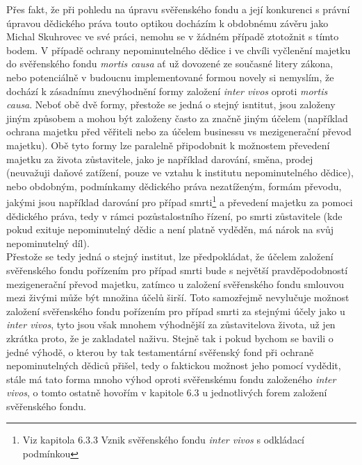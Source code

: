\documentclass{article}
\begin{document}
 Přes fakt, že při pohledu na úpravu svěřenského fondu a její konkurenci s právní úpravou dědického práva touto optikou docházím k obdobnému závěru jako Michal Skuhrovec ve své práci, nemohu se v žádném případě ztotožnit s tímto bodem. V případě ochrany nepominutelného dědice i ve chvíli vyčlenění majetku do svěřenského fondu \textit{mortis causa} ať už dovozené ze současné litery zákona, nebo potenciálně v budoucnu implementované formou novely si nemyslím, že dochází k zásadnímu znevýhodnění formy založení \textit{inter vivos} oproti \textit{mortis causa}. Neboť obě dvě formy, přestože se jedná o stejný isntitut, jsou založeny jiným způsobem a mohou být založeny často za značně jiným účelem (například ochrana majetku před věřiteli nebo za účelem businessu vs mezigenerační převod majetku). Obě tyto formy lze paralelně připodobnit k možnostem převedení majetku za života zůstavitele, jako je například darování, směna, prodej (neuvažuji daňové zatížení, pouze ve vztahu k institutu nepominutelného dědice), nebo obdobným, podmínkamy dědického práva nezatíženým, formám převodu, jakými jsou například darování pro případ smrti\footnote{Viz kapitola 6.3.3 Vznik svěřenského fondu \textit{inter vivos} s odkládací podmínkou} a převedení majetku za pomoci dědického práva, tedy v rámci pozůstalostního řízení, po smrti zůstavitele (kde pokud exituje nepominutelný dědic a není platně vyděděn, má nárok na svůj nepominutelný díl).\\
 
 Přestože se tedy jedná o stejný institut, lze předpokládat, že účelem založení svěřenského fondu pořízením pro případ smrti bude s největší pravděpodobností mezigenerační převod majetku, zatímco u založení svěřenského fondu smlouvou mezi živými může být množina účelů širší. Toto samozřejmě nevylučuje možnost založení svěřenského fondu pořízením pro případ smrti za stejnými účely jako u \textit{inter vivos}, tyto jsou však mnohem výhodnější za zůstavitelova života, už jen zkrátka proto, že je zakladatel naživu. Stejně tak i pokud bychom se bavili o jedné výhodě, o kterou by tak testamentární svěřenský fond při ochraně nepominutelných dědiců přišel, tedy o faktickou možnost jeho pomocí vydědit, stále má tato forma mnoho výhod oproti svěřenskému fondu založeného \textit{inter vivos}, o tomto ostatně hovořím v kapitole 6.3 u jednotlivých forem založení svěřenského fondu.\\
 
 
\end{document}
